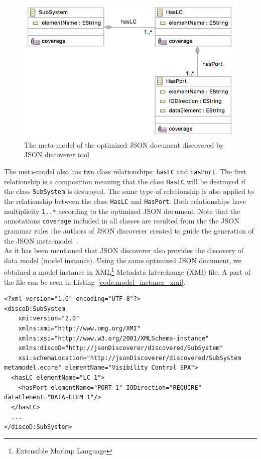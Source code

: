 \begin{figure}[H]
\centering
\captionsetup{justification=centering}
\vspace{0cm}%
\includegraphics[width=0.65\linewidth]{figure/new_model/new_metamodel.png}
\caption{The meta-model of the optimized JSON document discovered by JSON discoverer tool}
\label{fig:new_metamodel}
\end{figure}

The meta-model also has two class relationships: \texttt{hasLC} and \texttt{hasPort}. The first relationship is a composition meaning that the class \texttt{HasLC} will be destroyed if the class \texttt{SubSystem} is destroyed. The same type of relationship is also applied to the relationship between the class \texttt{HasLC} and \texttt{HasPort}. Both relationships have multiplicity \texttt{1..*} according to the optimized JSON document. Note that the annotations \texttt{coverage} included in all classes are resulted from the the JSON grammar rules the authors of JSON discoverer created to guide the generation of the JSON meta-model~\cite{Canovas}. \\

As it has been mentioned that JSON discoverer also provides the discovery of data model (model instance). Using the same optimized JSON document, we obtained a model instance in XML\footnote{Extensible Markup Language} Metadata Interchange (XMI) file. A part of the file can be seen in Listing~\ref{code:model_instance_xmi}.

\begin{lstlisting}[caption=Data model or model instance discovered by JSON discoverer,label=code:model_instance_xmi]
<?xml version="1.0" encoding="UTF-8"?>
<discoD:SubSystem
    xmi:version="2.0"
    xmlns:xmi="http://www.omg.org/XMI"
    xmlns:xsi="http://www.w3.org/2001/XMLSchema-instance"
    xmlns:discoD="http://jsonDiscoverer/discovered/SubSystem"
    xsi:schemaLocation="http://jsonDiscoverer/discovered/SubSystem metamodel.ecore" elementName="Visibility Control SPA">
  <hasLC elementName="LC 1">
    <hasPort elementName="PORT 1" IODirection="REQUIRE" dataElement="DATA-ELEM 1"/>
  </hasLC>
  ...
</discoD:SubSystem>
\end{lstlisting}

